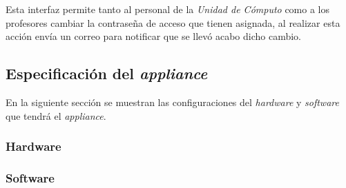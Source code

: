 Esta interfaz permite tanto al personal de la \emph{Unidad de C\'{o}mputo} como a los profesores cambiar la contrase\~{n}a de acceso que tienen asignada, al realizar esta acci\'{o}n env\'{i}a un correo para notificar que se llev\'{o} acabo dicho cambio.

    \subsection {Especificaci\'{o}n del \textit{appliance}}

En la siguiente secci\'{o}n se muestran las configuraciones del \emph{\gls{hardware}} y \emph{\gls{software}} que tendr\'{a} el \textit{appliance}.

      \subsubsection {Hardware}

{
 \begin{table}[H]
 \caption{Recursos de \textit{hardware} utilizados para el \textit{appliance}}{}
 \label{tab:recursos-hardware}
 \noindent{} %
 \end{table}
}

      \subsubsection {Software}

